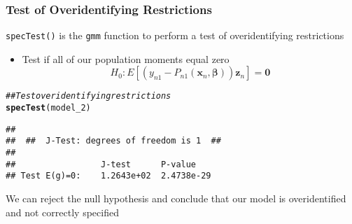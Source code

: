 \documentclass{beamer}\usepackage[]{graphicx}\usepackage[]{color}
\makeatletter
\newcommand{\hlcom}[1]{\textcolor[rgb]{0.678,0.584,0.686}{\textit{#1}}}%
\newcommand{\hlstd}[1]{\textcolor[rgb]{0.345,0.345,0.345}{#1}}%
\newcommand{\hlkwd}[1]{\textcolor[rgb]{0.737,0.353,0.396}{\textbf{#1}}}%
\newenvironment{kframe}{%
 \def\at@end@of@kframe{}%
 \ifinner\ifhmode%
  \def\at@end@of@kframe{\end{minipage}}%
  \begin{minipage}{\columnwidth}%
 \fi\fi%
 \def\FrameCommand##1{\hskip\@totalleftmargin \hskip-\fboxsep
 \colorbox{shadecolor}{##1}\hskip-\fboxsep
     \hskip-\linewidth \hskip-\@totalleftmargin \hskip\columnwidth}%
 \MakeFramed {\advance\hsize-\width
   \@totalleftmargin\z@ \linewidth\hsize
   \@setminipage}}%
 {\par\unskip\endMakeFramed%
 \at@end@of@kframe}
\newenvironment{knitrout}{}{} %
\makeatother
\begin{document}
\begin{frame}[fragile]\frametitle{Test of Overidentifying Restrictions}
  	\texttt{specTest()} is the \texttt{gmm} function to perform a test of overidentifying restrictions
  	\begin{itemize}
  		\item Test if all of our population moments equal zero
  		$$H_0: E[\left( y_{n1} - P_{n1}(\bm{x}_n, \bm{\beta}) \right) \bm{z}_n] = \bm{0}$$
  	\end{itemize}
\begin{knitrout}\footnotesize
{}\color{fgcolor}\begin{kframe}
\begin{alltt}
\hlcom{## Test overidentifying restrictions}
\hlkwd{specTest}\hlstd{(model_2)}
\end{alltt}
\begin{verbatim}
## 
##  ##  J-Test: degrees of freedom is 1  ## 
## 
##                 J-test      P-value   
## Test E(g)=0:    1.2643e+02  2.4738e-29
\end{verbatim}
\end{kframe}
\end{knitrout}
    \vspace{2ex}
    We can reject the null hypothesis and conclude that our model is overidentified and not correctly specified
\end{frame}
\end{document}
